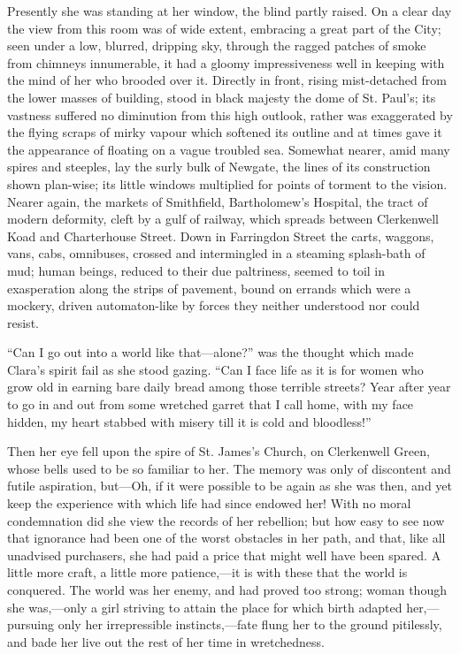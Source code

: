 Presently she was standing at her window, the blind partly raised. On a
clear day the view from this room was of wide extent, embracing a great
part of the City; seen under a low, blurred, dripping sky, through the
ragged patches of smoke from chimneys innumerable, it had a gloomy
impressiveness well in keeping with the mind of her who brooded over it.
Directly in front, rising mist-detached from the lower masses of
building, stood in black majesty the dome of St. Paul's; its vastness
suffered no diminution from this high outlook, rather was exaggerated by
the flying scraps of mirky vapour which softened its outline and at
times gave it the appearance of floating on a vague troubled sea.
Somewhat nearer, amid many spires and steeples, lay the surly bulk of
Newgate, the lines of its construction shown plan-wise; its
{\protect\hypertarget{73}{}{}}little windows multiplied for points of
torment to the vision. Nearer again, the markets of Smithfield,
Bartholomew's Hospital, the tract of modern deformity, cleft by a gulf
of railway, which spreads between Clerkenwell Koad and Charterhouse
Street. Down in Farringdon Street the carts, waggons, vans, cabs,
omnibuses, crossed and intermingled in a steaming splash-bath of mud;
human beings, reduced to their due paltriness, seemed to toil in
exasperation along the strips of pavement, bound on errands which were a
mockery, driven automaton-like by forces they neither understood nor
could resist.

``Can I go out into a world like that---alone?'' was the thought which
made Clara's spirit fail as she stood gazing. ``Can I face life as it is
for women who grow old in earning bare daily bread among those terrible
streets? Year after year to go in and out from some wretched garret that
I call home, with my face hidden, my heart stabbed with misery till it
is cold and bloodless!''

Then her eye fell upon the spire of St. James's Church, on Clerkenwell
Green, whose bells used to be so familiar to her. The
{\protect\hypertarget{74}{}{}}memory was only of discontent and futile
aspiration, but---Oh, if it were possible to be again as she was then,
and yet keep the experience with which life had since endowed her! With
no moral condemnation did she view the records of her rebellion; but how
easy to see now that ignorance had been one of the worst obstacles in
her path, and that, like all unadvised purchasers, she had paid a price
that might well have been spared. A little more craft, a little more
patience,---it is with these that the world is conquered. The world was
her enemy, and had proved too strong; woman though she was,---only a
girl striving to attain the place for which birth adapted
her,---pursuing only her irrepressible instincts,---fate flung her to
the ground pitilessly, and bade her live out the rest of her time in
wretchedness.

